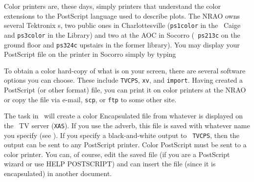      Color printers are, these days, simply printers that understand
the color extensions to the PostScript language used to describe
plots.  The NRAO owns several Tektronix s, two
public ones in Charlottesville ({\tt ps1color} in the \AIPS\ Caige and
{\tt ps3color} in the Library) and two at the AOC in Socorro ({\tt
ps213c} on the ground floor and {\tt ps324c} upstairs in the former
library).  You may display your PostScript file on the printer in
Socorro simply by typing


     To obtain a color hard-copy of what is on your screen, there are
several software options you can choose.  These include {\tt TVCPS},
{\tt xv}, and {\tt import}.  Having created a PostScript (or other
format) file, you can print it on color printers at the NRAO or copy
the file via e-mail, {\tt scp}, or {\tt ftp} to some other site.

     The {\tt {}} task in \AIPS\ will create a color
Encapsulated  file from whatever is displayed on the
\AIPS\ TV server ({\tt XAS})\@.  If you use the {\tt {}}
adverb, this file is saved with whatever name you specify (see
).  If you specify a black-and-white output to {\tt
TVCPS}, then the output can be sent to any PostScript printer.  Color
PostScript must be sent to a color printer.  You can, of course, edit
the saved file (if you are a PostScript wizard or use {\us HELP
POSTSCRIPT}) and can insert the file (since it is encapsulated) in
another document.

